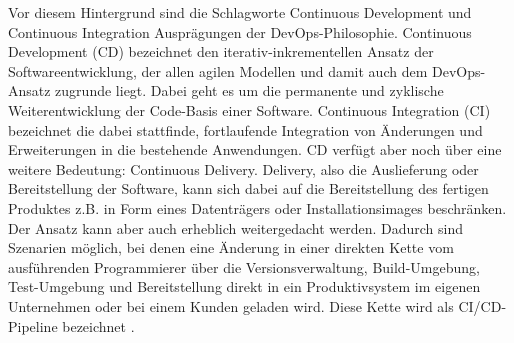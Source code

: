 Vor diesem Hintergrund sind die Schlagworte \glqq{}Continuous Development\grqq{} und \glqq{}Continuous Integration\grqq{} Ausprägungen der \gls{DevOps}-Philosophie. Continuous Development (\acrshort{CD}) bezeichnet den iterativ-inkrementellen Ansatz der Softwareentwicklung, der allen agilen Modellen und damit auch dem \gls{DevOps}-Ansatz zugrunde liegt. Dabei geht es um die permanente und zyklische Weiterentwicklung der Code-Basis einer Software. Continuous Integration (\acrshort{CI}) bezeichnet die dabei stattfinde, fortlaufende Integration von Änderungen und Erweiterungen in die bestehende Anwendungen. \acrshort{CD} verfügt aber noch über eine weitere Bedeutung: Continuous Delivery. Delivery, also die Auslieferung oder Bereitstellung der Software, kann sich dabei auf die Bereitstellung des fertigen Produktes z.B. in Form eines Datenträgers oder Installationsimages beschränken. Der Ansatz kann aber auch erheblich weitergedacht werden. Dadurch sind Szenarien möglich, bei denen eine Änderung in einer direkten Kette vom ausführenden Programmierer über die Versionsverwaltung, Build-Umgebung, Test-Umgebung und Bereitstellung direkt in ein Produktivsystem im eigenen Unternehmen oder bei einem Kunden geladen wird. Diese Kette wird als \acrshort{CI}/\acrshort{CD}-Pipeline bezeichnet \cite{DevOps_Definition_Microsoft}  \cite{DevOps_Definition_AWS} \cite{atlassian_CivsCDvsCD_nodate} \cite{NodeRed_CICD_nodate}. 